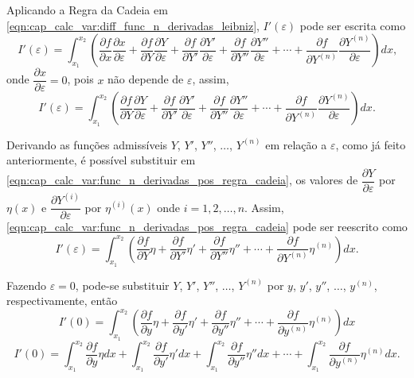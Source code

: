 \documentclass[
	12pt,				%
	openright,			%
    twoside,			%
	a4paper,			%
	english,			%
	french,				%
	spanish,			%
	brazil				%
	]{abntex2}
\numberwithin{lema}{chapter}
\numberwithin{teorema}{chapter}
\numberwithin{definicao}{chapter}
\numberwithin{exemplo}{chapter}
\numberwithin{figure}{chapter}
\begin{document}
Aplicando a Regra da Cadeia em \eqref{eqn:cap_calc_var:diff_func_n_derivadas_leibniz}, $I'(\varepsilon)$ pode ser escrita como
$$
	I'(\varepsilon)=\int_{x_1}^{x_2}
	\left (
		\frac{\partial f}{\partial x}
		\frac{\partial x}{\partial \varepsilon}
		+
		\frac{\partial f}{\partial Y}
		\frac{\partial Y}{\partial \varepsilon}
		+
		\frac{\partial f}{\partial Y'}
		\frac{\partial Y'}{\partial \varepsilon}
		+
		\frac{\partial f}{\partial Y''}
		\frac{\partial Y''}{\partial \varepsilon}
		+
		\cdots
		+
		\frac{\partial f}{\partial Y^{(n)}}
		\frac{\partial Y^{(n)}}{\partial \varepsilon}
	\right ) dx
	\text{,}
$$
onde $\dfrac{\partial x}{\partial \varepsilon} = 0$, pois $x$ não depende de $\varepsilon$, assim,
\begin{equation}
	\label{eqn:cap_calc_var:func_n_derivadas_pos_regra_cadeia}
	I'(\varepsilon)=\int_{x_1}^{x_2}
	\left (
		\frac{\partial f}{\partial Y}
		\frac{\partial Y}{\partial \varepsilon}
		+
		\frac{\partial f}{\partial Y'}
		\frac{\partial Y'}{\partial \varepsilon}
		+
		\frac{\partial f}{\partial Y''}
		\frac{\partial Y''}{\partial \varepsilon}
		+
		\cdots
		+
		\frac{\partial f}{\partial Y^{(n)}}
		\frac{\partial Y^{(n)}}{\partial \varepsilon}
	\right ) dx
	\text{.}
\end{equation}

Derivando as funções admissíveis $Y$, $Y'$, $Y''$, $\dots$, $Y^{(n)}$ em relação a $\varepsilon$, como já feito anteriormente, é possível substituir em \eqref{eqn:cap_calc_var:func_n_derivadas_pos_regra_cadeia}, os valores de $\dfrac{\partial Y}{\partial \varepsilon}$ por $\eta(x)$ e $\dfrac{\partial Y^{(i)}}{\partial \varepsilon}$ por $\eta^{(i)}(x)$ onde $i=1, 2, \dots, n$. Assim, \eqref{eqn:cap_calc_var:func_n_derivadas_pos_regra_cadeia} pode ser reescrito como
\begin{equation}
	\label{eqn:cap_calc_var:func_n_derivadas_replace_0}
	I'(\varepsilon)=
	\int_{x_1}^{x_2} \left (
		\frac{\partial f}{\partial Y} \eta
		+
		\frac{\partial f}{\partial Y'} \eta'
		+
		\frac{\partial f}{\partial Y''} \eta''
		+
		\cdots
		+
		\frac{\partial f}{\partial Y^{(n)}} \eta^{(n)}
	\right ) dx
	\text{.}
\end{equation}

Fazendo $\varepsilon=0$, pode-se substituir $Y$, $Y'$, $Y''$, $\dots$, $Y^{(n)}$ por $y$, $y'$, $y''$, $\dots$, $y^{(n)}$, respectivamente, então
$$
	I'(0)= \int_{x_1}^{x_2} \left (
		\frac{\partial f}{\partial y} \eta
		+
		\frac{\partial f}{\partial y'} \eta'
		+
		\frac{\partial f}{\partial y''} \eta''
		+
		\cdots
		+
		\frac{\partial f}{\partial y^{(n)}} \eta^{(n)}
	\right )dx
$$
\begin{equation}
	\label{eqn:cap_calc_var:func_n_derivadas_pos_separar}
	I'(0)= 
	\int_{x_1}^{x_2}
		\frac{\partial f}{\partial y} \eta
	dx
	+		
	\int_{x_1}^{x_2}
		\frac{\partial f}{\partial y'} \eta'
	dx
	+
	\int_{x_1}^{x_2}
		\frac{\partial f}{\partial y''} \eta''
	dx
	+
	\cdots
	+
	\int_{x_1}^{x_2}
		\frac{\partial f}{\partial y^{(n)}} \eta^{(n)}
	dx
	\text{.}
\end{equation}
\end{document}

